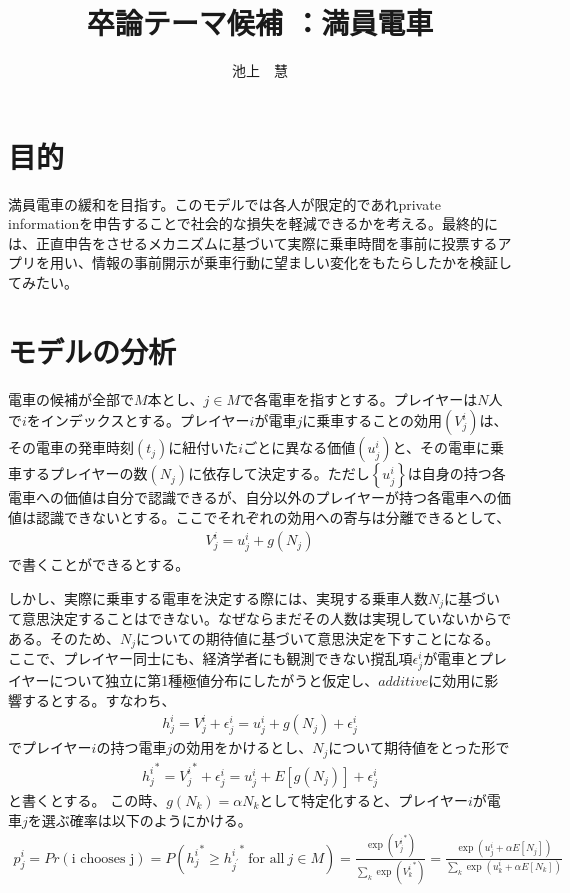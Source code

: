 \documentclass{jsarticle}
\begin{document}
\title{卒論テーマ候補 ：満員電車}
\author{池上　慧}
\maketitle

\section{目的}
満員電車の緩和を目指す。このモデルでは各人が限定的であれprivate informationを申告することで社会的な損失を軽減できるかを考える。最終的には、正直申告をさせるメカニズムに基づいて実際に乗車時間を事前に投票するアプリを用い、情報の事前開示が乗車行動に望ましい変化をもたらしたかを検証してみたい。

\section{モデルの分析}
電車の候補が全部で$M$本とし、$j \in M$で各電車を指すとする。プレイヤーは$N$人で$i$をインデックスとする。プレイヤー$i$が電車$j$に乗車することの効用$(V_j^i)$は、その電車の発車時刻$(t_j)$に紐付いた$i$ごとに異なる価値$(u_j^i)$と、その電車に乗車するプレイヤーの数$(N_j)$に依存して決定する。ただし$\left\{u_j^i\right\}$は自身の持つ各電車への価値は自分で認識できるが、自分以外のプレイヤーが持つ各電車への価値は認識できないとする。ここでそれぞれの効用への寄与は分離できるとして、
\begin{align*}
	V_j^i = u_j^i + g(N_j)
\end{align*}
で書くことができるとする。

しかし、実際に乗車する電車を決定する際には、実現する乗車人数$N_j$に基づいて意思決定することはできない。なぜならまだその人数は実現していないからである。そのため、$N_j$についての期待値に基づいて意思決定を下すことになる。ここで、プレイヤー同士にも、経済学者にも観測できない撹乱項$\epsilon_j^i$が電車とプレイヤーについて独立に第1種極値分布にしたがうと仮定し、$additive$に効用に影響するとする。すなわち、
\begin{align*}
	h_j^i = V_j^i + \epsilon_j^i = u_j^i + g(N_j) + \epsilon_j^i
\end{align*}
でプレイヤー$i$の持つ電車$j$の効用をかけるとし、$N_j$について期待値をとった形で
\begin{align*}
	{h_j^i}^* = {V_j^i}^* + \epsilon_j^i = u_j^i + E[g(N_j)] + \epsilon_j^i
\end{align*}
と書くとする。
この時、$g(N_k) = \alpha N_k$として特定化すると、プレイヤー$i$が電車$j$を選ぶ確率は以下のようにかける。
\begin{align*}
	p_j^i = Pr(\text{i chooses j}) = P({h_j^i}^* \geq {h_{j^{'}}^i}^*\ \text{for all}\ j \in M) = \frac{\exp({V_j^i}^*)}{\sum_k \exp({V_k^i}^*)} = \frac{\exp(u_j^i + \alpha E[N_j])}{\sum_k \exp(u_k^i + \alpha E[N_k])}
\end{align*}
\end{document}
